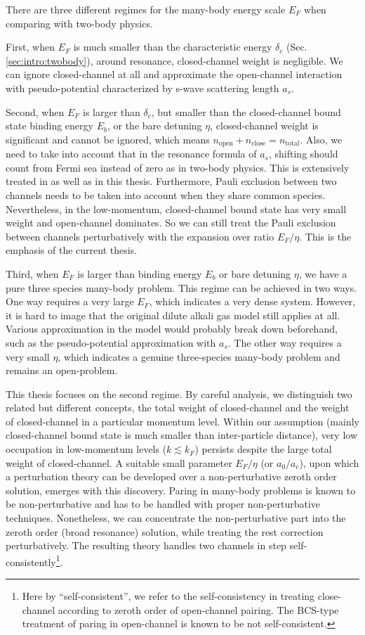 There are three different regimes for the many-body energy scale $E_F$ when comparing with two-body physics.  

First, when $E_F$ is much smaller than the characteristic energy $\delta_c$ (Sec. \ref{sec:intro:twobody}), around resonance, closed-channel weight is negligible. We can ignore closed-channel at all and approximate the open-channel interaction with pseudo-potential characterized by s-wave scattering length $a_s$. 

Second, when $E_F$ is larger than $\delta_c$, but smaller than the closed-channel bound state binding energy $E_b$, or the bare detuning $\eta$, closed-channel weight is significant and cannot be ignored, which means $n_{\text{open}}+n_{\text{close}}=n_{\text{total}}$. Also, we need to take into account that in the resonance formula of $a_s$, shifting should count from Fermi sea instead of zero as in two-body physics.    This is extensively treated in \cite{GurarieNarrow} as well as in this thesis.  Furthermore, Pauli exclusion between two channels needs to be taken into account when they share common species.  Nevertheless, in the low-momentum, closed-channel bound state has very small weight and  open-channel dominates.  So we can still treat the Pauli exclusion between channels perturbatively with the expansion over ratio $E_F/\eta$.  This is the emphasis of the current thesis.  

Third, when $E_F$ is larger than binding energy $E_b$ or bare detuning $\eta$, we have a pure three species many-body problem. This regime can be achieved in two ways.  One way requires a very large $E_F$, which indicates a very dense system.  However, it is hard to image that  the original dilute alkali gas model still applies at all. Various approximation in the model would probably break down beforehand, such as the pseudo-potential approximation with $a_s$. The other way requires a very small $\eta$, which indicates a genuine three-species many-body problem and remains an open-problem.   

This thesis focuses on the second regime.  By careful analysis, we distinguish two related but different concepts, the total weight of closed-channel  and the weight of closed-channel in a particular momentum level.  
       Within our assumption (mainly closed-channel bound state is much smaller than inter-particle distance), very low occupation in low-momentum levels ($k\lesssim{}k_{F}$) persists despite the large total weight of closed-channel.     A suitable small parameter $E_F/\eta$ (or $a_0/a_c$), upon which a perturbation theory can be developed over a non-perturbative zeroth order solution, emerges with this discovery.  Paring in many-body problems is known to be  non-perturbative and has to be handled with proper non-perturbative techniques.  Nonetheless, we can concentrate the non-perturbative part into the zeroth order  (broad resonance) solution, while treating the rest correction perturbatively.   The resulting theory  handles two channels in step self-consistently\footnote{Here by ``self-consistent'', we refer to the self-consistency in treating close-channel according to zeroth order of open-channel pairing.  The BCS-type treatment of paring in open-channel   is known to be not self-consistent. }. 
       
